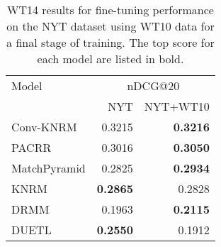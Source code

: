 \begin{table}
\centering
\caption{WT14 results for fine-tuning performance on the NYT dataset using WT10 data for a final stage of training. The top score for each model are listed in bold.%
}
\label{tab:finetune}
\begin{tabular}{lrr}
\toprule
Model & \multicolumn{2}{c}{nDCG@20}\\ \cmidrule(lr){2-3} 
        &NYT & NYT+WT10 \\
\midrule



Conv-KNRM & 0.3215 & \bf0.3216 \\
PACRR & 0.3016 & \bf0.3050 \\
MatchPyramid & 0.2825 & \bf0.2934 \\
KNRM & \bf0.2865 & 0.2828 \\
DRMM & 0.1963 & \bf0.2115 \\
DUETL & \bf0.2550 & 0.1912 \\



\bottomrule
    \end{tabular}
\end{table}
